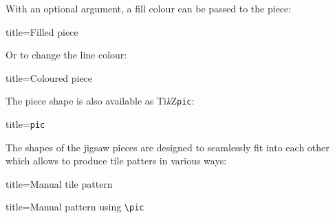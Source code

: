 \documentclass[parskip=half]{scrartcl}
\newcommand{\TikZ}{Ti\emph{k}Z\xspace}
\begin{document}
With an optional argument, a fill colour can be passed to the piece:

\begin{tcblisting}{title={Filled piece}}
\end{tcblisting}

Or to change the line colour:

\begin{tcblisting}{title={Coloured piece}}
\end{tcblisting}

The piece shape is also available as \TikZ \verb|pic|:

\begin{tcblisting}{title={\texttt{pic}}}
\end{tcblisting}

The shapes of the jigsaw pieces are designed to seamlessly fit into each other which allows to produce tile patters in various ways:

\begin{tcblisting}{title={Manual tile pattern}}
\end{tcblisting}

\begin{tcblisting}{title={Manual pattern using \texttt{\textbackslash pic}}}
\end{tcblisting}
\end{document}

